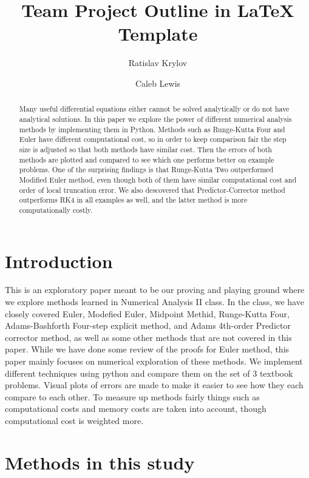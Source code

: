 \documentclass[11pt]{article}	%
\title{Team Project Outline in LaTeX Template}
\author{Ratislav Krylov \and Caleb Lewis}
\date{} %
\begin{document}
\maketitle

\begin{abstract}
Many useful differential equations either cannot be solved analytically or do not have analytical solutions. 
In this paper we explore the power of different numerical analysis methods by implementing
them in Python.
Methods such as Runge-Kutta Four and Euler have different computational cost, so in order
to keep comparison fair the step size is adjusted so that both methods have similar cost.
Then the errors of both methods are plotted and compared to see which one performs better on
example problems. One of the surprising findings is that Runge-Kutta Two outperformed 
Modified Euler method, even though both of them have similar computational cost and order of 
local truncation error. We also descovered that Predictor-Corrector method outperforms RK4 in
all examples as well, and the latter method is more computationally costly. 
\end{abstract}

\section{Introduction}
This is an exploratory paper meant to be our proving and playing ground where we explore
methods learned in Numerical Analysis II class. In the class, we have closely covered Euler,
Modefied Euler, Midpoint Methid, Runge-Kutta Four, Adams-Bashforth Four-step explicit method,
and Adams 4th-order Predictor corrector method, as well as some other methods that are not
covered in this paper. While we have done some review of the proofs for Euler method, this 
paper mainly focuses on numerical exploration of these methods. We implement different techniques using python and compare them on the set of 3 textbook problems. Visual plots of errors are made 
to make it easier to see how they each compare to each other. To measure up methods fairly 
things such as computational costs and memory costs are taken into account, though 
computational cost is weighted more.

\section{Methods in this study}
\end{document}
